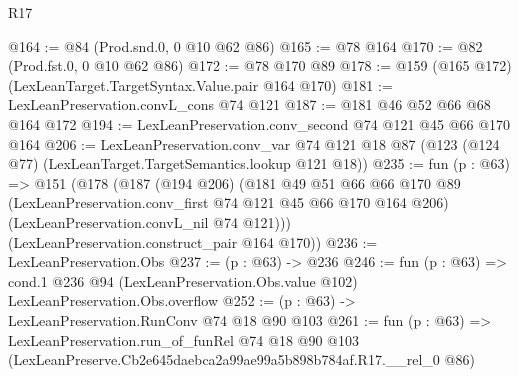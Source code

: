\begin{lexlean}{R17}
\begin{coremodule}
@164 := @84 (Prod.snd.{0, 0} @10 @62 @86)
@165 := @78 @164
@170 := @82 (Prod.fst.{0, 0} @10 @62 @86)
@172 := @78 @170 @89
@178 := @159 (@165 @172) (LexLeanTarget.TargetSyntax.Value.pair @164 @170)
@181 := LexLeanPreservation.convL_cons @74 @121
@187 := @181 @46 @52 @66 @68 @164 @172
@194 := LexLeanPreservation.conv_second @74 @121 @45 @66 @170 @164
@206 := LexLeanPreservation.conv_var
    @74
    @121
    @18
    @87
    (@123 (@124 @77) (LexLeanTarget.TargetSemantics.lookup @121 @18))
@235 := fun (p : @63) =>
  @151
    (@178
      (@187
        (@194 @206)
        (@181
          @49
          @51
          @66
          @66
          @170
          @89
          (LexLeanPreservation.conv_first @74 @121 @45 @66 @170 @164 @206)
          (LexLeanPreservation.convL_nil @74 @121)))
      (LexLeanPreservation.construct_pair @164 @170))
@236 := LexLeanPreservation.Obs
@237 := (p : @63) -> @236
@246 := fun (p : @63) =>
  cond.{1} @236 @94 (LexLeanPreservation.Obs.value @102) LexLeanPreservation.Obs.overflow
@252 := (p : @63) -> LexLeanPreservation.RunConv @74 @18 @90 @103
@261 := fun (p : @63) =>
  LexLeanPreservation.run_of_funRel
    @74
    @18
    @90
    @103
    (LexLeanPreserve.Cb2e645daebca2a99ae99a5b898b784af.R17.__rel_0 @86)
\end{coremodule}
\end{lexlean}
